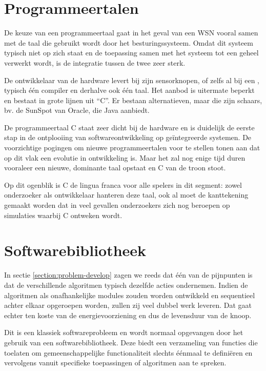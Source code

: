 \vspace{-3mm}

\section{Programmeertalen}
\label{section:solution-proglang}

De keuze van een programmeertaal gaat in het geval van een WSN vooral samen met
de taal die gebruikt wordt door het besturingssysteem. Omdat dit systeem
typisch niet op zich staat en de toepassing samen met het systeem tot een
geheel verwerkt wordt, is de integratie tussen de twee zeer sterk.

De ontwikkelaar van de hardware levert bij zijn sensorknopen, of zelfs al bij
een \mcu, typisch \'e\'en compiler en derhalve ook \'e\'en taal. Het aanbod is
uitermate beperkt en bestaat in grote lijnen uit ``C''. Er bestaan
alternatieven, maar die zijn schaars, bv. de SunSpot van Oracle, die Java
aanbiedt.

De programmeertaal C staat zeer dicht bij de hardware en is duidelijk de eerste
stap in de ontplooiing van softwareontwikkeling op ge\"integreerde systemen. De
voorzichtige pogingen om nieuwe programmeertalen voor te stellen tonen aan dat
op dit vlak een evolutie in ontwikkeling is. Maar het zal nog enige tijd duren
vooraleer een nieuwe, dominante taal opstaat en C van de troon stoot.

Op dit ogenblik is C de lingua franca voor alle spelers in dit segment: zowel
onderzoeker als ontwikkelaar hanteren deze taal, ook al moet de kanttekening
gemaakt worden dat in veel gevallen onderzoekers zich nog beroepen op
simulaties waarbij C ontweken wordt.

\vspace{-3mm}

\section{Softwarebibliotheek}
\label{section:solution-library}

In sectie \ref{section:problem-develop} zagen we reeds dat \'e\'en van de
pijnpunten is dat de verschillende algoritmen typisch dezelfde acties
ondernemen. Indien de algoritmen als onafhankelijke modules zouden worden
ontwikkeld en sequentieel achter elkaar opgeroepen worden, zullen zij veel
dubbel werk leveren. Dat gaat echter ten koste van de energievoorziening en dus
de levensduur van de knoop.

Dit is een klassiek softwareprobleem en wordt normaal opgevangen door het
gebruik van een softwarebibliotheek. Deze biedt een verzameling van functies
die toelaten om gemeenschappelijke functionaliteit slechts \'e\'enmaal te
defini\"eren en vervolgens vanuit specifieke toepassingen of algoritmen aan te
spreken.

